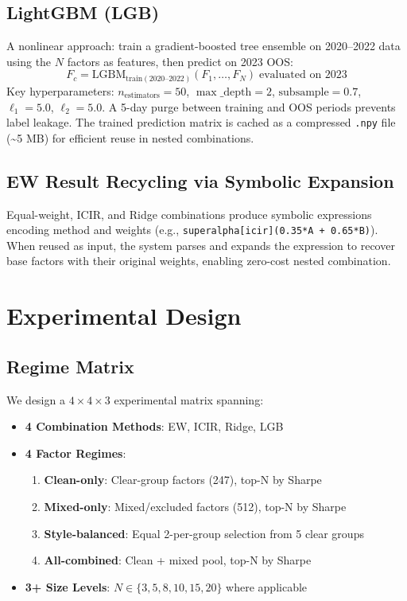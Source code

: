 \documentclass[11pt,a4paper]{ctexart}
\begin{document}
\subsection{LightGBM (LGB)}
A nonlinear approach: train a gradient-boosted tree ensemble on 2020--2022 data using the $N$ factors as features, then predict on 2023 OOS:
\begin{equation}
F_c = \text{LGBM}_{\text{train}(2020\text{--}2022)}(F_1, \ldots, F_N) \; \text{evaluated on 2023}
\end{equation}
Key hyperparameters: $n_{\text{estimators}}=50$, $\max\_\text{depth}=2$, $\text{subsample}=0.7$, $\ell_1=5.0$, $\ell_2=5.0$. A 5-day purge between training and OOS periods prevents label leakage. The trained prediction matrix is cached as a compressed \texttt{.npy} file (\textasciitilde5 MB) for efficient reuse in nested combinations.

\subsection{EW Result Recycling via Symbolic Expansion}
Equal-weight, ICIR, and Ridge combinations produce symbolic expressions encoding method and weights (e.g., \texttt{superalpha[icir](0.35*A + 0.65*B)}). When reused as input, the system parses and expands the expression to recover base factors with their original weights, enabling zero-cost nested combination.

\section{Experimental Design}
\label{sec:experiments}

\subsection{Regime Matrix}

We design a $4 \times 4 \times 3$ experimental matrix spanning:

\begin{itemize}[nosep]
    \item \textbf{4 Combination Methods}: EW, ICIR, Ridge, LGB
    \item \textbf{4 Factor Regimes}:
        \begin{enumerate}[nosep]
            \item \textbf{Clean-only}: Clear-group factors (247), top-N by Sharpe
            \item \textbf{Mixed-only}: Mixed/excluded factors (512), top-N by Sharpe
            \item \textbf{Style-balanced}: Equal 2-per-group selection from 5 clear groups
            \item \textbf{All-combined}: Clean + mixed pool, top-N by Sharpe
        \end{enumerate}
    \item \textbf{3+ Size Levels}: $N \in \{3,5,8,10,15,20\}$ where applicable
\end{itemize}
\end{document}
